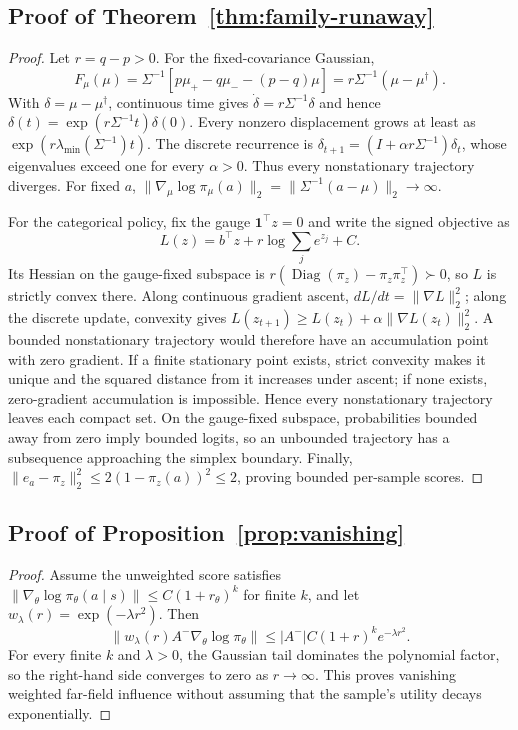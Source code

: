 \subsection{Proof of Theorem~\ref{thm:family-runaway}}
\label{app:proof-family-runaway}
\begin{proof}
Let $r=q-p>0$. For the fixed-covariance Gaussian,
\begin{equation}
F_\mu(\mu)=\Sigma^{-1}[p\mu_+-q\mu_--(p-q)\mu]
=r\Sigma^{-1}(\mu-\mu^\dagger).
\end{equation}
With $\delta=\mu-\mu^\dagger$, continuous time gives
$\dot\delta=r\Sigma^{-1}\delta$ and hence
$\delta(t)=\exp(r\Sigma^{-1}t)\delta(0)$.
Every nonzero displacement grows at least as
$\exp(r\lambda_{\min}(\Sigma^{-1})t)$.
The discrete recurrence is
$\delta_{t+1}=(I+\alpha r\Sigma^{-1})\delta_t$, whose eigenvalues exceed one for every $\alpha>0$.
Thus every nonstationary trajectory diverges. For fixed $a$,
$\|\nabla_\mu\log\pi_\mu(a)\|_2=\|\Sigma^{-1}(a-\mu)\|_2\to\infty$.

For the categorical policy, fix the gauge $\mathbf1^\top z=0$ and write the signed objective as
\begin{equation}
L(z)=b^\top z+r\log\sum_j e^{z_j}+C.
\end{equation}
Its Hessian on the gauge-fixed subspace is
$r(\operatorname{Diag}(\pi_z)-\pi_z\pi_z^\top)\succ0$, so $L$ is strictly convex there.
Along continuous gradient ascent, $dL/dt=\|\nabla L\|_2^2$; along the discrete update, convexity gives
$L(z_{t+1})\ge L(z_t)+\alpha\|\nabla L(z_t)\|_2^2$.
A bounded nonstationary trajectory would therefore have an accumulation point with zero gradient. If a finite stationary point exists, strict convexity makes it unique and the squared distance from it increases under ascent; if none exists, zero-gradient accumulation is impossible. Hence every nonstationary trajectory leaves each compact set.
On the gauge-fixed subspace, probabilities bounded away from zero imply bounded logits, so an unbounded trajectory has a subsequence approaching the simplex boundary. Finally,
$\|e_a-\pi_z\|_2^2\le2(1-\pi_z(a))^2\le2$, proving bounded per-sample scores.
\end{proof}

\subsection{Proof of Proposition~\ref{prop:vanishing}}
\label{app:proof-far-field}
\begin{proof}
Assume the unweighted score satisfies $\|\nabla_\theta\log\pi_\theta(a\mid s)\|\le C(1+r_\theta)^k$ for finite $k$, and let $w_\lambda(r)=\exp(-\lambda r^2)$. Then
\begin{equation}
\|w_\lambda(r)A^-\nabla_\theta\log\pi_\theta\|
\le |A^-|C(1+r)^k e^{-\lambda r^2}.
\end{equation}
For every finite $k$ and $\lambda>0$, the Gaussian tail dominates the polynomial factor, so the right-hand side converges to zero as $r\to\infty$. This proves vanishing weighted far-field influence without assuming that the sample's utility decays exponentially.
\end{proof}

